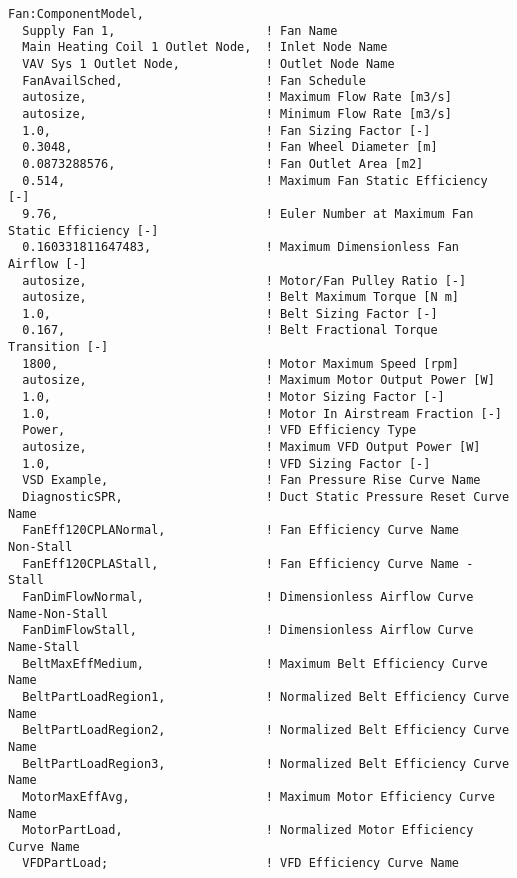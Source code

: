 \begin{lstlisting}
Fan:ComponentModel,
  Supply Fan 1,                     ! Fan Name
  Main Heating Coil 1 Outlet Node,  ! Inlet Node Name
  VAV Sys 1 Outlet Node,            ! Outlet Node Name
  FanAvailSched,                    ! Fan Schedule
  autosize,                         ! Maximum Flow Rate [m3/s]
  autosize,                         ! Minimum Flow Rate [m3/s]
  1.0,                              ! Fan Sizing Factor [-]
  0.3048,                           ! Fan Wheel Diameter [m]
  0.0873288576,                     ! Fan Outlet Area [m2]
  0.514,                            ! Maximum Fan Static Efficiency [-]
  9.76,                             ! Euler Number at Maximum Fan Static Efficiency [-]
  0.160331811647483,                ! Maximum Dimensionless Fan Airflow [-]
  autosize,                         ! Motor/Fan Pulley Ratio [-]
  autosize,                         ! Belt Maximum Torque [N m]
  1.0,                              ! Belt Sizing Factor [-]
  0.167,                            ! Belt Fractional Torque Transition [-]
  1800,                             ! Motor Maximum Speed [rpm]
  autosize,                         ! Maximum Motor Output Power [W]
  1.0,                              ! Motor Sizing Factor [-]
  1.0,                              ! Motor In Airstream Fraction [-]
  Power,                            ! VFD Efficiency Type
  autosize,                         ! Maximum VFD Output Power [W]
  1.0,                              ! VFD Sizing Factor [-]
  VSD Example,                      ! Fan Pressure Rise Curve Name
  DiagnosticSPR,                    ! Duct Static Pressure Reset Curve Name
  FanEff120CPLANormal,              ! Fan Efficiency Curve Name     Non-Stall
  FanEff120CPLAStall,               ! Fan Efficiency Curve Name - Stall
  FanDimFlowNormal,                 ! Dimensionless Airflow Curve Name-Non-Stall
  FanDimFlowStall,                  ! Dimensionless Airflow Curve Name-Stall
  BeltMaxEffMedium,                 ! Maximum Belt Efficiency Curve Name
  BeltPartLoadRegion1,              ! Normalized Belt Efficiency Curve Name
  BeltPartLoadRegion2,              ! Normalized Belt Efficiency Curve Name
  BeltPartLoadRegion3,              ! Normalized Belt Efficiency Curve Name
  MotorMaxEffAvg,                   ! Maximum Motor Efficiency Curve Name
  MotorPartLoad,                    ! Normalized Motor Efficiency Curve Name
  VFDPartLoad;                      ! VFD Efficiency Curve Name
\end{lstlisting}

